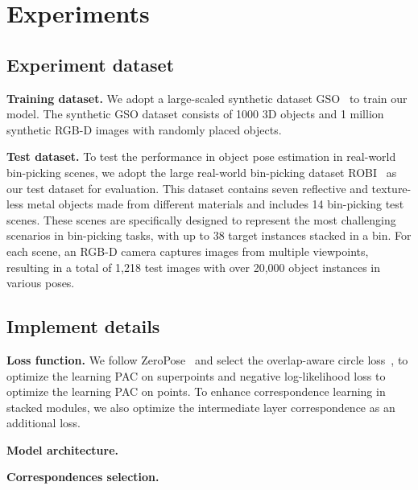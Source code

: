 \section{Experiments}
\subsection{Experiment dataset} 
\noindent\textbf{Training dataset.} We adopt a large-scaled synthetic dataset GSO~\cite{suresh2023midastouch, labbe2022megapose} to train our model. The synthetic GSO dataset consists of 1000 3D objects and 1 million synthetic RGB-D images with randomly placed objects.

\noindent\textbf{Test dataset.} 
To test the performance in object pose estimation in real-world bin-picking scenes, we adopt the large real-world bin-picking dataset ROBI~\cite{robi} as our test dataset for evaluation. 
This dataset contains seven reflective and texture-less metal objects made from different materials and includes 14 bin-picking test scenes.
These scenes are specifically designed to represent the most challenging scenarios in bin-picking tasks, with up to 38 target instances stacked in a bin.
For each scene, an RGB-D camera captures images from multiple viewpoints, resulting in a total of 1,218 test images with over 20,000 object instances in various poses.

\subsection{Implement details} 
\noindent\textbf{Loss function.} We follow ZeroPose~\cite{chen2023zeropose} and select the overlap-aware circle loss~\cite{qin2023geotransformer}, to optimize the learning PAC on superpoints and negative log-likelihood loss to optimize the learning PAC on points. To enhance correspondence learning in stacked modules, we also optimize the intermediate layer correspondence as an additional loss.

\vspace{1mm}
\noindent\textbf{Model architecture.}

\vspace{1mm}
\noindent\textbf{Correspondences selection.}

